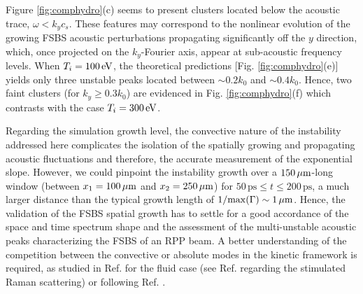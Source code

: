 \documentclass[
 reprint,
 amsmath,amssymb,
 aps,
]{revtex4-1}
\begin{document}
Figure  \ref{fig:comphydro}(c) seems to  present  clusters located below the acoustic trace, $\omega <k_y c_s$. These features may correspond to the  nonlinear evolution of the growing FSBS acoustic perturbations propagating significantly off the $y$ direction, which, once projected on the $k_y$-Fourier axis, appear at sub-acoustic frequency levels. 
When $T_i=100\, \rm eV$, the theoretical predictions [Fig. \ref{fig:comphydro}(e)] yields only three unstable peaks located between $\sim 0.2k_0$ and $\sim 0.4k_0$. Hence, two faint clusters (for $k_y\ge 0.3k_0$) are evidenced in Fig. \ref{fig:comphydro}(f) which contrasts with the case $T_i=300\, \rm eV$.

Regarding the simulation growth level, the convective nature of the instability  addressed here complicates the isolation of the spatially growing and propagating  acoustic fluctuations and therefore, the accurate measurement of the exponential slope.   
However, we could pinpoint the instability growth over a $150\,\rm\mu m$-long window (between  $x_1=100\,\rm \mu m$  and $x_2=250\, \rm\mu m$) for $50\,\mathrm{ps}\le t\le200\,\mathrm{ps}$, 
a much larger distance than the typical  growth length of $1/\mathrm{max}(\Gamma)\sim 1\,\rm\mu m$.  
Hence, the validation of the  FSBS spatial growth has to settle for a good accordance of the space and time spectrum shape and the assessment of the  multi-unstable acoustic peaks  characterizing the FSBS of an RPP beam.
A better  understanding of the competition between the convective or absolute modes in the kinetic framework is required,   as studied  in Ref. \cite[]{phd-Grech,PRL_Grech_2009} for the fluid case  (see Ref. \cite[]{POP_Grismayer_2004}  regarding the stimulated Raman scattering) or  following   Ref. \cite[]{PR_Hall_68}.
\end{document}
